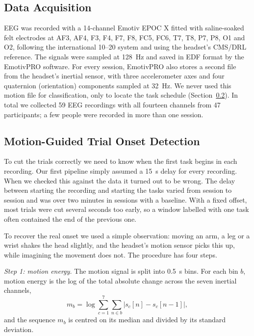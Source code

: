 \documentclass[pdflatex,sn-mathphys-num]{sn-jnl}%
\theoremstyle{thmstyleone}%
\theoremstyle{thmstyletwo}%
\theoremstyle{thmstylethree}%
\begin{document}
\subsection{Data Acquisition}\label{subsec:acquisition}

EEG was recorded with a 14-channel Emotiv EPOC X fitted with saline-soaked felt electrodes at AF3, AF4, F3, F4, F7, F8, FC5, FC6, T7, T8, P7, P8, O1 and O2, following the international 10--20 system and using the headset's CMS/DRL reference. The signals were sampled at 128~Hz and saved in EDF format by the EmotivPRO software. For every session, EmotivPRO also stores a second file from the headset's inertial sensor, with three accelerometer axes and four quaternion (orientation) components sampled at 32~Hz. We never used this motion file for classification, only to locate the task schedule (Section~\ref{subsec:onset}). In total we collected 59 EEG recordings with all fourteen channels from 47 participants; a few people were recorded in more than one session.

\subsection{Motion-Guided Trial Onset Detection}\label{subsec:onset}

To cut the trials correctly we need to know when the first task begins in each recording. Our first pipeline simply assumed a 15~s delay for every recording. When we checked this against the data it turned out to be wrong. The delay between starting the recording and starting the tasks varied from session to session and was over two minutes in sessions with a baseline. With a fixed offset, most trials were cut several seconds too early, so a window labelled with one task often contained the end of the previous one.

To recover the real onset we used a simple observation: moving an arm, a leg or a wrist shakes the head slightly, and the headset's motion sensor picks this up, while imagining the movement does not. The procedure has four steps.

\emph{Step 1: motion energy.} The motion signal is split into 0.5~s bins. For each bin $b$, motion energy is the log of the total absolute change across the seven inertial channels,
\begin{equation}
m_b = \log \sum_{c=1}^{7} \sum_{n \in b} \left| s_c[n] - s_c[n-1] \right|,
\end{equation}
and the sequence $m_b$ is centred on its median and divided by its standard deviation.
\end{document}
